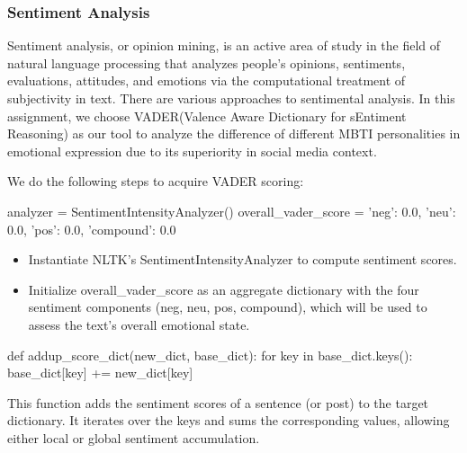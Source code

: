 \documentclass[12pt]{article}
\numberwithin{figure}{section}  %
\begin{document}
	
	
	
	\subsubsection{Sentiment Analysis}
	Sentiment analysis, or opinion mining, is an active area of study in the
	field of natural language processing that analyzes people's opinions,
	sentiments, evaluations, attitudes, and emotions via the computational
	treatment of subjectivity in text. There are various approaches to
	sentimental analysis. In this assignment, we choose VADER(Valence Aware
	Dictionary for sEntiment Reasoning) as our tool to analyze the difference of
	different MBTI personalities in emotional expression due to its superiority
	in social media context\cite{VADER}.
	
	
	We do the following steps to acquire VADER scoring:

	 \begin{python}
analyzer = SentimentIntensityAnalyzer()
overall_vader_score = {'neg': 0.0, 'neu': 0.0, 'pos': 0.0, 'compound': 0.0}
	\end{python}
	\begin{itemize}
	\item Instantiate NLTK’s SentimentIntensityAnalyzer to compute sentiment
	scores.
	\item Initialize overall\_vader\_score as an aggregate dictionary with the
	four sentiment components (neg, neu, pos, compound), which will be used to
	assess the text’s overall emotional state.

	\end{itemize}

	\begin{python}
def addup_score_dict(new_dict, base_dict):
    for key in base_dict.keys():
        base_dict[key] += new_dict[key]
	\end{python}
	This function adds the sentiment scores of a sentence (or post) to the
	target dictionary. It iterates over the keys and sums the corresponding
	values, allowing either local or global sentiment accumulation.
\end{document}

